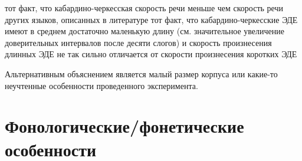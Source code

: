 \begin{itemize}
\mytem тот факт, что кабардино-черкесская скорость речи меньше чем скорость речи других языков, описанных в литературе
\mytem тот факт, что кабардино-черкесские ЭДЕ имеют в среднем достаточно маленькую длину (см. значительное увеличение доверительных интервалов после десяти слогов) и скорость произнесения длинных ЭДЕ не так сильно отличается от скорости произнесения коротких ЭДЕ
\end{itemize}
\par Альтернативным объяснением является малый размер корпуса или какие-то неучтенные особенности проведенного эксперимента.
\pagebreak
\section{Фонологические/фонетические особенности}
